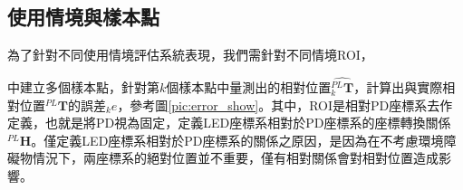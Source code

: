 \subsection{使用情境與樣本點}
\label{chp:scenario}




為了針對不同使用情境評估系統表現，我們需針對不同情境ROI，



中建立多個樣本點，針對第$k$個樣本點中量測出的相對位置$\hat{^{PL}_{k}\boldsymbol{T}}$，計算出與實際相對位置$^{PL}\boldsymbol{T}$的誤差$_k e$，參考圖\ref{pic:error_show}。其中，ROI是相對PD座標系去作定義，也就是將PD視為固定，定義LED座標系相對於PD座標系的座標轉換關係$^{PL}\boldsymbol{H}$。僅定義LED座標系相對於PD座標系的關係之原因，是因為在不考慮環境障礙物情況下，兩座標系的絕對位置並不重要，僅有相對關係會對相對位置造成影響。






